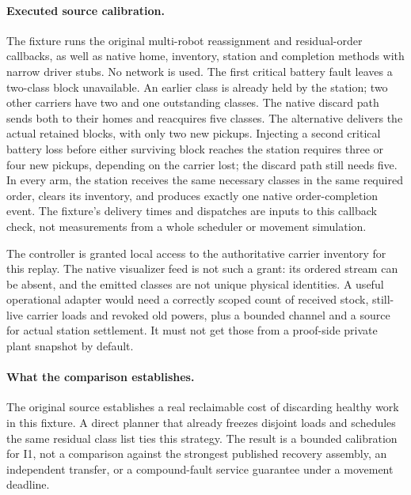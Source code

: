 \documentclass{article}
\begin{document}
\paragraph{Executed source calibration.}
The fixture runs the original multi-robot reassignment and
residual-order callbacks, as well as native home, inventory,
station and completion methods with narrow driver stubs. No
network is used. The first critical battery fault leaves a
two-class block unavailable. An earlier class is already held by
the station; two other carriers have two and one outstanding
classes. The native discard path sends both to their homes and
reacquires five classes. The alternative delivers the actual
retained blocks, with only two new pickups. Injecting a second
critical battery loss before either surviving block reaches the
station requires three or four new pickups, depending on the
carrier lost; the discard path still needs five. In every arm,
the station receives the same necessary classes in the same
required order, clears its inventory, and produces exactly one
native order-completion event. The fixture's delivery times and
dispatches are inputs to this callback check, not measurements
from a whole scheduler or movement simulation.

The controller is granted local access to the authoritative
carrier inventory for this replay. The native visualizer feed
is not such a grant: its ordered stream can be absent, and
the emitted classes are not unique physical identities. A useful
operational adapter would need a correctly scoped count of
received stock, still-live carrier loads and revoked old powers,
plus a bounded channel and a source for actual station
settlement. It must not get those from a proof-side private
plant snapshot by default.

\paragraph{What the comparison establishes.}
The original source establishes a real reclaimable cost of
discarding healthy work in this fixture. A direct planner that
already freezes disjoint loads and schedules the same residual
class list ties this strategy. The result is a bounded
calibration for I1, not a comparison against the strongest
published recovery assembly, an independent transfer, or a
compound-fault service guarantee under a movement deadline.
\end{document}
